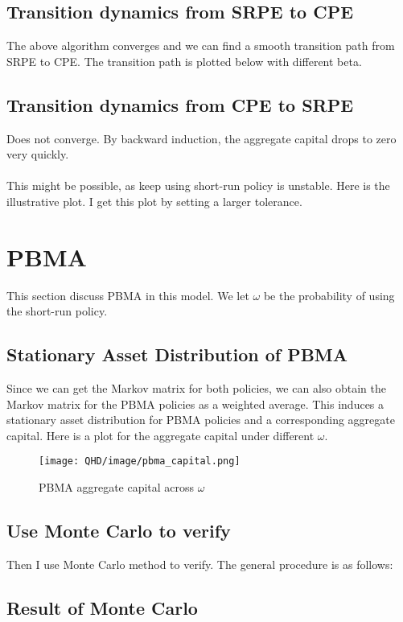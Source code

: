 \documentclass[11pt,a4paper]{article}
\begin{document}
\subsection{Transition dynamics from SRPE to CPE}
The above algorithm converges and we can find a smooth transition path from SRPE to CPE. The transition path is plotted below with different beta.

\subsection{Transition dynamics from CPE to SRPE}
Does not converge. By backward induction, the aggregate capital drops to zero very quickly.\\
\\
This might be possible, as keep using short-run policy is unstable.  Here is the illustrative plot. I get this plot by setting a larger tolerance.

\section{PBMA}
This section discuss PBMA in this model. We let $\omega$ be the probability of using the short-run policy.
\subsection{Stationary Asset Distribution of PBMA}
Since we can get the Markov matrix for both policies, we can also obtain the Markov matrix for the PBMA policies as a weighted average. This induces a stationary asset distribution for PBMA policies and a corresponding aggregate capital. Here is a plot for the aggregate capital under different $\omega$.
\begin{figure}[h!]
    \centering
    \texttt{[image: QHD/image/pbma\_capital.png]}
    \caption{PBMA aggregate capital across $\omega$}
\end{figure}

\subsection{Use Monte Carlo to verify}

Then I use Monte Carlo method to verify. The general procedure is as follows:



\subsection{Result of Monte Carlo}
\end{document}
